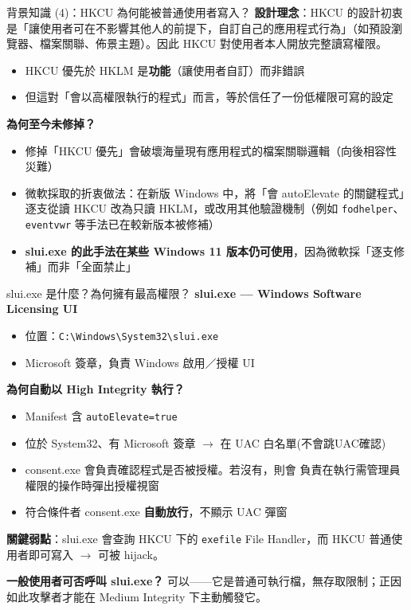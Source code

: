 \documentclass[12pt,aspectratio=169]{beamer}
\begin{document}
\begin{frame}{背景知識 (4)：HKCU 為何能被普通使用者寫入？}
\textbf{設計理念}：HKCU 的設計初衷是「讓使用者可在不影響其他人的前提下，自訂自己的應用程式行為」（如預設瀏覽器、檔案關聯、佈景主題）。因此 HKCU 對使用者本人開放完整讀寫權限。
\begin{itemize}
  \item HKCU 優先於 HKLM 是\textbf{功能}（讓使用者自訂）而非錯誤
  \item 但這對「會以高權限執行的程式」而言，等於信任了一份低權限可寫的設定
\end{itemize}

\textbf{為何至今未修掉？}
\begin{itemize}
  \item 修掉「HKCU 優先」會破壞海量現有應用程式的檔案關聯邏輯（向後相容性災難）
  \item 微軟採取的折衷做法：在新版 Windows 中，將「會 autoElevate 的關鍵程式」逐支從讀 HKCU 改為只讀 HKLM，或改用其他驗證機制（例如 \texttt{fodhelper}、\texttt{eventvwr} 等手法已在較新版本被修補）
  \item \textbf{slui.exe 的此手法在某些 Windows 11 版本仍可使用}，因為微軟採「逐支修補」而非「全面禁止」
\end{itemize}
\end{frame}

\begin{frame}[fragile]{slui.exe 是什麼？為何擁有最高權限？}
\textbf{slui.exe — Windows Software Licensing UI}
\begin{itemize}
  \item 位置：\texttt{C:\textbackslash Windows\textbackslash System32\textbackslash slui.exe}
  \item Microsoft 簽章，負責 Windows 啟用／授權 UI
\end{itemize}

\vspace{0.4em}
\textbf{為何自動以 High Integrity 執行？}
\begin{itemize}
  \item Manifest 含 \texttt{autoElevate=true}
  \item 位於 System32、有 Microsoft 簽章 $\rightarrow$ 在 UAC 白名單(不會跳UAC確認)
  \item consent.exe 會負責確認程式是否被授權。若沒有，則會 負責在執行需管理員權限的操作時彈出授權視窗
  \item 符合條件者 consent.exe \textbf{自動放行}，不顯示 UAC 彈窗
\end{itemize}

\vspace{0.3em}
\textbf{關鍵弱點}：slui.exe 會查詢 HKCU 下的 \texttt{exefile} File Handler，而 HKCU 普通使用者即可寫入 $\rightarrow$ 可被 hijack。

\vspace{0.3em}
\textbf{一般使用者可否呼叫 slui.exe？} 可以——它是普通可執行檔，無存取限制；正因如此攻擊者才能在 Medium Integrity 下主動觸發它。
\end{frame}
\end{document}
